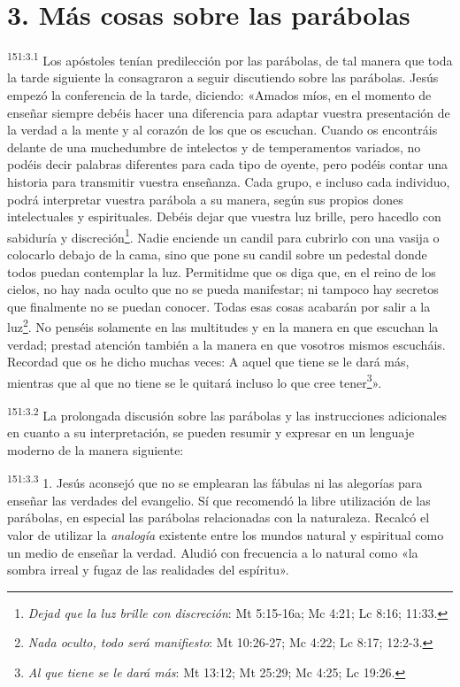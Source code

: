 \section*{3. Más cosas sobre las parábolas}
\par
\textsuperscript{151:3.1} Los apóstoles tenían predilección por las parábolas, de tal manera que toda la tarde siguiente la consagraron a seguir discutiendo sobre las parábolas. Jesús empezó la conferencia de la tarde, diciendo: «Amados míos, en el momento de enseñar siempre debéis hacer una diferencia para adaptar vuestra presentación de la verdad a la mente y al corazón de los que os escuchan. Cuando os encontráis delante de una muchedumbre de intelectos y de temperamentos variados, no podéis decir palabras diferentes para cada tipo de oyente, pero podéis contar una historia para transmitir vuestra enseñanza. Cada grupo, e incluso cada individuo, podrá interpretar vuestra parábola a su manera, según sus propios dones intelectuales y espirituales. Debéis dejar que vuestra luz brille, pero hacedlo con sabiduría y discreción\footnote{\textit{Dejad que la luz brille con discreción}: Mt 5:15-16a; Mc 4:21; Lc 8:16; 11:33.}. Nadie enciende un candil para cubrirlo con una vasija o colocarlo debajo de la cama, sino que pone su candil sobre un pedestal donde todos puedan contemplar la luz. Permitidme que os diga que, en el reino de los cielos, no hay nada oculto que no se pueda manifestar; ni tampoco hay secretos que finalmente no se puedan conocer. Todas esas cosas acabarán por salir a la luz\footnote{\textit{Nada oculto, todo será manifiesto}: Mt 10:26-27; Mc 4:22; Lc 8:17; 12:2-3.}. No penséis solamente en las multitudes y en la manera en que escuchan la verdad; prestad atención también a la manera en que vosotros mismos escucháis. Recordad que os he dicho muchas veces: A aquel que tiene se le dará más, mientras que al que no tiene se le quitará incluso lo que cree tener\footnote{\textit{Al que tiene se le dará más}: Mt 13:12; Mt 25:29; Mc 4:25; Lc 19:26.}».

\par
\textsuperscript{151:3.2} La prolongada discusión sobre las parábolas y las instrucciones adicionales en cuanto a su interpretación, se pueden resumir y expresar en un lenguaje moderno de la manera siguiente:

\par
\textsuperscript{151:3.3} 1. Jesús aconsejó que no se emplearan las fábulas ni las alegorías para enseñar las verdades del evangelio. Sí que recomendó la libre utilización de las parábolas, en especial las parábolas relacionadas con la naturaleza. Recalcó el valor de utilizar la \textit{analogía} existente entre los mundos natural y espiritual como un medio de enseñar la verdad. Aludió con frecuencia a lo natural como «la sombra irreal y fugaz de las realidades del espíritu».


